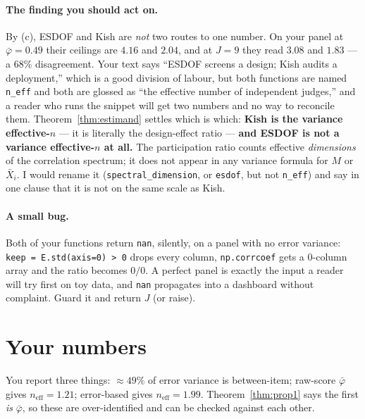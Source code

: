 \documentclass[11pt]{article}
\theoremstyle{plain}
\theoremstyle{definition}
\theoremstyle{remark}
\newcommand{\pb}{\bar{\varphi}}
\newcommand{\neff}{n_{\mathrm{eff}}}
\begin{document}
\paragraph{The finding you should act on.} By (c), ESDOF and Kish are \emph{not} two routes to one
number. On your panel at $\pb=0.49$ their ceilings are $4.16$ and $2.04$, and at $J=9$ they read
$3.08$ and $1.83$ --- a $68\%$ disagreement. Your text says ``ESDOF screens a design; Kish audits a
deployment,'' which is a good division of labour, but both functions are named \texttt{n\_eff} and
both are glossed as ``the effective number of independent judges,'' and a reader who runs the
snippet will get two numbers and no way to reconcile them. Theorem~\ref{thm:estimand} settles
which is which: \textbf{Kish is the variance effective-$n$} --- it is literally the design-effect
ratio --- \textbf{and ESDOF is not a variance effective-$n$ at all.} The participation ratio
counts effective \emph{dimensions} of the correlation spectrum; it does not appear in any variance
formula for $M$ or $\bar X_i$. I would rename it (\texttt{spectral\_dimension}, or
\texttt{esdof}, but not \texttt{n\_eff}) and say in one clause that it is not on the same scale as
Kish.

\paragraph{A small bug.} Both of your functions return \texttt{nan}, silently, on a panel with no
error variance: \texttt{keep = E.std(axis=0) > 0} drops every column, \texttt{np.corrcoef} gets a
$0$-column array and the ratio becomes $0/0$. A perfect panel is exactly the input a reader will
try first on toy data, and \texttt{nan} propagates into a dashboard without complaint. Guard it
and return $J$ (or raise).

\section{Your numbers}\label{sec:numbers}

You report three things: $\approx49\%$ of error variance is between-item; raw-score $\pb$ gives
$\neff=1.21$; error-based gives $\neff=1.99$. Theorem~\ref{thm:prop1} says the first \emph{is}
$\pb$, so these are over-identified and can be checked against each other.
\end{document}
